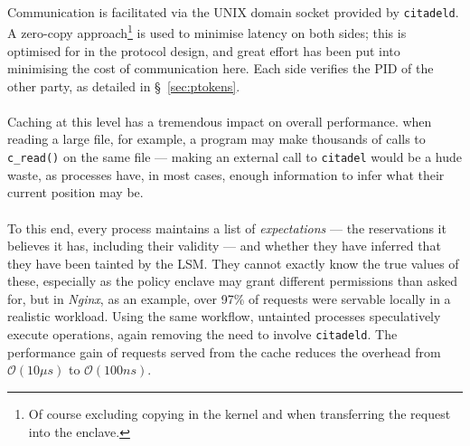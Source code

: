 \paragraph{} Communication is facilitated via the UNIX domain socket provided by \texttt{citadeld}. A zero-copy approach\footnote{Of course excluding copying in the kernel and when transferring the request into the enclave.} is used to minimise latency on both sides; this is optimised for in the protocol design, and great effort has been put into minimising the cost of communication here. Each side verifies the PID of the other party, as detailed in §~\ref{sec:ptokens}.

\paragraph{} Caching at this level has a tremendous impact on overall performance. when reading a large file, for example, a program may make thousands of calls to \texttt{c\_read()} on the same file --- making an external call to \texttt{citadel} would be a hude waste, as processes have, in most cases, enough information to infer what their current position may be.

\paragraph{} To this end, every process  maintains a list of \textit{expectations} --- the reservations it believes it has, including their validity --- and whether they have inferred that they have been tainted by the LSM. They cannot exactly know the true values of these, especially as the policy enclave may grant different permissions than asked for, but in \textit{Nginx}, as an example, over 97\% of requests were servable locally in a realistic workload. Using the same workflow, untainted processes speculatively execute operations, again removing the need to involve \texttt{citadeld}. The performance gain of requests served from the cache reduces the overhead from $\mathcal{O}(10\mu s)$ to $\mathcal{O}(100ns)$.


